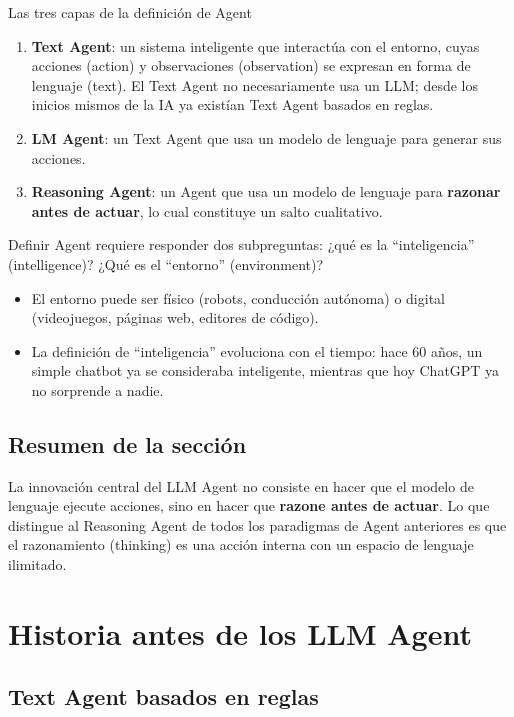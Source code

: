 \documentclass[a4paper]{article}
\begin{document}
\begin{importantbox}{Las tres capas de la definición de Agent}
\begin{enumerate}
    \item \textbf{Text Agent}: un sistema inteligente que interactúa con el entorno, cuyas acciones (action) y observaciones (observation) se expresan en forma de lenguaje (text). El Text Agent no necesariamente usa un LLM; desde los inicios mismos de la IA ya existían Text Agent basados en reglas.
    \item \textbf{LM Agent}: un Text Agent que usa un modelo de lenguaje para generar sus acciones.
    \item \textbf{Reasoning Agent}: un Agent que usa un modelo de lenguaje para \textbf{razonar antes de actuar}, lo cual constituye un salto cualitativo.
\end{enumerate}
\end{importantbox}

Definir Agent requiere responder dos subpreguntas: ¿qué es la ``inteligencia'' (intelligence)? ¿Qué es el ``entorno'' (environment)?

\begin{itemize}
    \item El entorno puede ser físico (robots, conducción autónoma) o digital (videojuegos, páginas web, editores de código).
    \item La definición de ``inteligencia'' evoluciona con el tiempo: hace 60 años, un simple chatbot ya se consideraba inteligente, mientras que hoy ChatGPT ya no sorprende a nadie.
\end{itemize}

\subsection{Resumen de la sección}

La innovación central del LLM Agent no consiste en hacer que el modelo de lenguaje ejecute acciones, sino en hacer que \textbf{razone antes de actuar}. Lo que distingue al Reasoning Agent de todos los paradigmas de Agent anteriores es que el razonamiento (thinking) es una acción interna con un espacio de lenguaje ilimitado.
\section{Historia antes de los LLM Agent}

\subsection{Text Agent basados en reglas}
\end{document}
